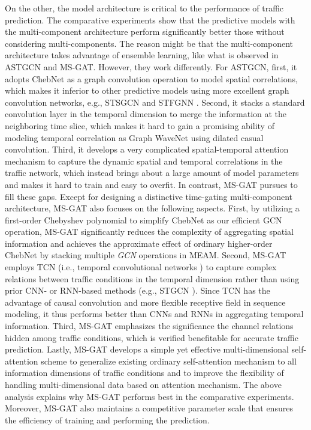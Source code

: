 On the other, the model architecture   is critical to the performance of traffic prediction. The comparative experiments show that the predictive models with the multi-component architecture perform significantly better  those without considering multi-components. The reason might be that the multi-component architecture takes advantage of ensemble learning, like what is observed in ASTGCN \cite{guo2019attention} and MS-GAT. However, they work differently. For ASTGCN, first, it adopts ChebNet \cite{defferrard2016convolutional} as a graph convolution operation to model spatial correlations, which makes it inferior to other predictive models using more excellent graph convolution networks, e.g., STSGCN \cite{song2020spatial} and STFGNN \cite{mengzhang2020spatial}. Second, it stacks a standard convolution layer in the temporal dimension to merge the information at the neighboring time slice, which makes it hard to gain a promising ability of modeling temporal correlation as Graph WaveNet \cite{wu2019graph} using dilated casual convolution. Third, it develops a very complicated spatial-temporal attention mechanism to capture the dynamic spatial and temporal correlations in the traffic network, which instead brings about a large amount of model parameters and makes it hard to train and easy to overfit. In contrast, MS-GAT pursues to fill these gaps. Except for designing a distinctive time-gating multi-component architecture, MS-GAT also focuses on the following aspects. First, by utilizing a first-order Chebyshev polynomial to simplify ChebNet \cite{defferrard2016convolutional} as our efficient GCN operation, MS-GAT  significantly reduces the complexity of aggregating spatial information and achieves the approximate effect of ordinary higher-order ChebNet by stacking multiple \textit{GCN} operations in MEAM. Second, MS-GAT employs TCN (i.e., temporal convolutional networks \cite{bai2018empirical}) to capture complex relations between traffic conditions in the temporal dimension rather than using prior CNN- or RNN-based methods (e.g., STGCN \cite{yu2017spatio}). Since TCN has the advantage of causal convolution and more flexible receptive field in sequence modeling, it thus performs better than CNNs and RNNs in aggregating temporal information. Third, MS-GAT emphasizes the significance the channel relations hidden among traffic conditions, which is verified  benefitable for accurate traffic prediction. Lastly, MS-GAT develops a simple yet effective multi-dimensional self-attention scheme to generalize existing ordinary self-attention mechanism to all information dimensions of traffic conditions and to improve the flexibility of handling multi-dimensional data based on attention mechanism. The above analysis explains why MS-GAT performs best in the comparative experiments. Moreover, MS-GAT also maintains a competitive parameter scale that ensures the efficiency of training and performing the prediction.

